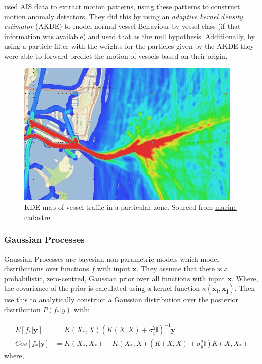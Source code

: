 \documentclass[bsc,frontabs,twoside,singlespacing,parskip,deptreport]{infthesis}     %
\begin{document}
\cite{ristic2008statistical} used AIS data to extract motion patterns, using these patterns to construct motion anomaly detectors. They did this by using an \emph{adaptive kernel density estimator} (AKDE) to model normal vessel Behaviour by vessel class (if that information was available) and used that as the null hypothesis. Additionally, by using a particle filter with the weights for the particles given by the AKDE they were able to forward predict the motion of vessels based on their origin.

\begin{figure}
    \centering
    \includegraphics[]{report/images/ship_density_sm.png}
    \caption{KDE map of vessel traffic in a particular zone. Sourced from \href{https://marinecadastre.gov/ais/}{marine cadastre.}}
    \label{fig:density}
\end{figure}

\subsubsection{Gaussian Processes}
\label{sss:gp}
Gaussian Processes are bayesian non-parametric models which model distributions over functions $f$ with input $\mathbf{x}$. They assume that there is a probabilistic, zero-centred, Gaussian prior over all functions with input $\mathbf{x}$. Where, the covariance of the prior is calculated using a kernel function $\kappa(\mathbf{x_i}, \mathbf{x_j})$. Then use this to analytically construct a Gaussian distribution over the posterior distribution $P(f_* | y)$  with:

\begin{align}
E[f_*|\mathbf{y}] &= K(X_*, X)(K(X, X) + \sigma_y^2\mathbb{I})^{-1}\mathbf{y} \\
Cov[f_*|\mathbf{y}] &= K(X_*, X_*) - K(X_*, X)(K(X, X) + \sigma^2_y\mathbb{I})K(X, X_*)
\end{align}
where,
\end{document}
